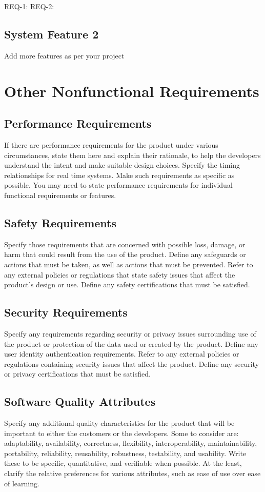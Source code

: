REQ-1:	
REQ-2:	


\subsection{System Feature 2}
Add more features as per your project

\section{Other Nonfunctional Requirements}
\subsection*{Performance Requirements}
If there are performance requirements for the product under various circumstances, state them here and explain their rationale, to help the developers understand the intent and make suitable design choices. Specify the timing relationships for real time systems. Make such requirements as specific as possible. You may need to state performance requirements for individual functional requirements or features.

\subsection*{Safety Requirements}
Specify those requirements that are concerned with possible loss, damage, or harm that could result from the use of the product. Define any safeguards or actions that must be taken, as well as actions that must be prevented. Refer to any external policies or regulations that state safety issues that affect the product’s design or use. Define any safety certifications that must be satisfied.

\subsection*{Security Requirements}
Specify any requirements regarding security or privacy issues surrounding use of the product or protection of the data used or created by the product. Define any user identity authentication requirements. Refer to any external policies or regulations containing security issues that affect the product. Define any security or privacy certifications that must be satisfied.

\subsection*{Software Quality Attributes}
Specify any additional quality characteristics for the product that will be important to either the customers or the developers. Some to consider are: adaptability, availability, correctness, flexibility, interoperability, maintainability, portability, reliability, reusability, robustness, testability, and usability. Write these to be specific, quantitative, and verifiable when possible. At the least, clarify the relative preferences for various attributes, such as ease of use over ease of learning.

